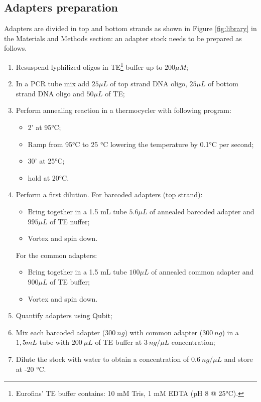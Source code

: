 \documentclass[a4paper, 12pt]{report}
\begin{document}
\subsection{Adapters preparation}
\vspace{-1em}
Adapters are divided in top and bottom strands as shown in Figure \ref{fig:library} in the Materials and Methods section: an adapter stock needs to be prepared as follows.
\vspace{-1.5em}
\begin{enumerate}\setlength\itemsep{-0.2em}
	\item Resuspend lyphilized oligos in TE\footnote{Eurofins' TE buffer contains: 10 mM Tris, 1 mM EDTA (pH 8 @ 25°C).} buffer up to $200 \mu M$;
	\item In a PCR tube mix add $25 \mu L$ of top strand DNA oligo, $25 \mu L$ of bottom strand DNA oligo and $50 \mu L$ of TE;
	\item Perform annealing reaction in a thermocycler with following program:
	\begin{itemize}\setlength\itemsep{-0.2em}
		\item 2' at 95°C;
		\item Ramp from 95°C to 25 °C lowering the temperature by 0.1°C per second;
		\item 30' at 25°C;
		\item hold at 20°C.
	\end{itemize}
	\item Perform a first dilution. For barcoded adapters (top strand):
	\begin{itemize}\setlength\itemsep{-0.2em}
		\item Bring together in a 1.5 mL tube $5.6 \mu L$ of annealed barcoded adapter and $995 \mu L$ of TE nuffer;
		\item Vortex and spin down.
	\end{itemize}
	\vspace{-0.5em}
	For the common adapters:
	\vspace{-1em}
	\begin{itemize}\setlength\itemsep{-0.2em}
		\item Bring together in a 1.5 mL tube $100 \mu L$ of annealed common adapter and $900 \mu L$ of TE buffer;
		\item Vortex and spin down.
	\end{itemize}
	\item Quantify adapters using Qubit;
	\item Mix each barcoded adapter ($300 \ ng$) with common adapter ($300 \ ng$) in a $1,5 mL$ tube with $200 \ \mu L$ of TE buffer at $3 \ ng/\mu L$ concentration;
	\item Dilute the stock with water to obtain a concentration of $0.6 \ ng/ \mu L$ and store at -20 °C.
\end{enumerate}
\end{document}
